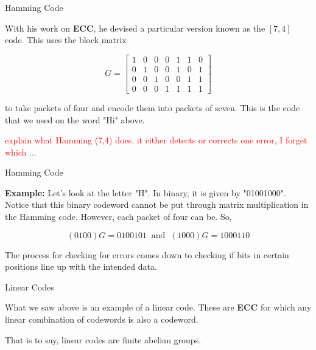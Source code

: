 \documentclass{beamer}
\begin{document}
\begin{frame}{Hamming Code}
    
    With his work on \textbf{ECC}, he devised a particular version known as the $[7,4]$ code. This uses
    the block matrix

    $$G=\left[\begin{array}{ccccccc}
        1 & 0 & 0 & 0 & 1 & 1 & 0 \\
        0 & 1 & 0 & 0 & 1 & 0 & 1 \\
        0 & 0 & 1 & 0 & 0 & 1 & 1 \\
        0 & 0 & 0 & 1 & 1 & 1 & 1
    \end{array}\right]$$

    to take packets of four and encode them into packets of seven. This is the code that we used on the
    word "Hi" above.
    
    \textcolor{red}{explain what Hamming (7,4) does.  it either detects or corrects one error, I forget which ...}

\end{frame}

\begin{frame}{Hamming Code}
    
    \textbf{Example:} Let's look at the letter "H". In binary, it is given by
    "01001000". Notice that this binary codeword cannot be put through matrix multiplication in the
    Hamming code. However, each packet of four can be. So,

    $$(0 1 0 0)G=0100101\;\;\text{and}\;\; (1 0 0 0)G=1000110$$

    \bigskip

    \pause

    The process for checking for errors comes down to checking if bits in certain positions line up with
    the intended data.

\end{frame}

\begin{frame}{Linear Codes}
    
    What we saw above is an example of a linear code. These are \textbf{ECC} for which any linear
    combination of codewords is also a codeword.

    \bigskip

    That is to say, linear codes are finite abelian groups.

\end{frame}
\end{document}
